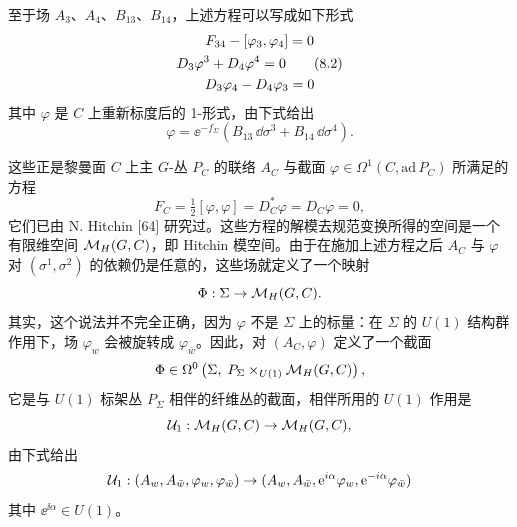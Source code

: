 至于场 $A_3$、$A_4$、$B_{13}$、$B_{14}$，上述方程可以写成如下形式
\begin{gather}
F_{34}-[\varphi_3,\varphi_4]=0 \notag\\
D_3\varphi^3+D_4\varphi^4=0 \tag{8.2}\\
D_3\varphi_4-D_4\varphi_3=0 \notag
\end{gather}
其中 $\varphi$ 是 $C$ 上重新标度后的 1-形式，由下式给出
\[
\varphi=\ee^{-f_\Sigma}\left(B_{13}\,\dd\sigma^3+B_{14}\,\dd\sigma^4\right).
\]

这些正是黎曼面 $C$ 上主 $G$-丛 $P_C$ 的联络 $A_C$ 与截面 $\varphi\in\Omega^1(C,\mathrm{ad}\,P_C)$ 所满足的方程
\[
F_C=\tfrac12[\varphi,\varphi]=D_C^*\varphi=D_C\varphi=0,
\]
它们已由 N. Hitchin [64] 研究过。这些方程的解模去规范变换所得的空间是一个有限维空间 $\mathcal{M}_H(G,C)$，即 Hitchin 模空间。由于在施加上述方程之后 $A_C$ 与 $\varphi$ 对 $(\sigma^1,\sigma^2)$ 的依赖仍是任意的，这些场就定义了一个映射
\[
\Phi:\Sigma\to\mathcal{M}_H(G,C).
\]
其实，这个说法并不完全正确，因为 $\varphi$ 不是 $\Sigma$ 上的标量：在 $\Sigma$ 的 $U(1)$ 结构群作用下，场 $\varphi_w$ 会被旋转成 $\varphi_{\bar w}$。因此，对 $(A_C,\varphi)$ 定义了一个截面
\[
\Phi\in\Omega^0\left(\Sigma,\;P_\Sigma\times_{U(1)}\mathcal{M}_H(G,C)\right),
\]
它是与 $U(1)$ 标架丛 $P_\Sigma$ 相伴的纤维丛的截面，相伴所用的 $U(1)$ 作用是
\[
\mathcal{U}_1:\mathcal{M}_H(G,C)\to\mathcal{M}_H(G,C),
\]
由下式给出
\[
\mathcal{U}_1:(A_w,A_{\bar w},\varphi_w,\varphi_{\bar w})\to(A_w,A_{\bar w},\mathrm{e}^{i\alpha}\varphi_w,\mathrm{e}^{-i\alpha}\varphi_{\bar w})
\]
其中 $\ee^{\ii\alpha}\in U(1)$。

